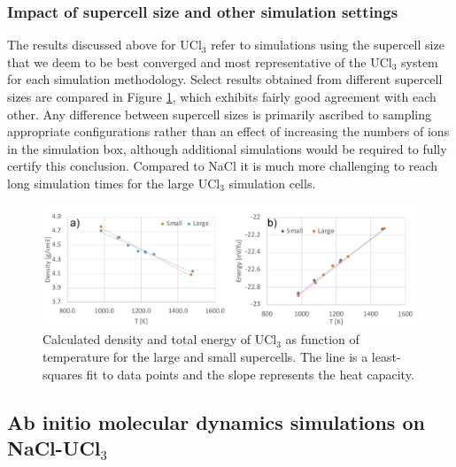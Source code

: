 \documentclass[titlepage=firstiscover,11pt,fleqn,headheight=14pt,footheight=40.8pt]{scrreprt}
\begin{document}

\subsubsection{Impact of supercell size and other simulation settings}
The results discussed above for UCl$_3$ refer to simulations using the supercell size that we deem to be best converged and most representative of the UCl$_3$ system for each simulation methodology. Select results obtained from different supercell sizes are compared in Figure \ref{fig:UCl3size}, which exhibits fairly good agreement with each other.  Any difference between supercell sizes is primarily ascribed to sampling appropriate configurations rather than an effect of increasing the numbers of ions in the simulation box, although additional simulations would be required to fully certify this conclusion. Compared to NaCl it is much more challenging to reach long simulation times for the large UCl$_3$ simulation cells. 

\begin{figure}[htb]
\centering
\includegraphics[width=1.00\textwidth]{FIG4b.pdf}
\caption{Calculated density and total energy of UCl$_3$ as function of temperature for the large and small supercells. The line is a least-squares fit to data points and the slope represents the heat capacity.} 
\label{fig:UCl3size}
\end{figure}

 
\subsection{Ab initio molecular dynamics simulations on NaCl-UCl$_3$}
\end{document}
